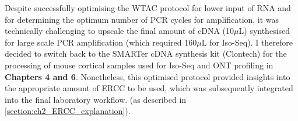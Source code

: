 Despite successfully optimising the WTAC protocol for lower input of RNA and for determining the optimum number of PCR cycles for amplification, it was technically challenging to upscale the final amount of cDNA (10$\mu$L) synthesised for large scale PCR amplification (which required 160$\mu$L for Iso-Seq). I therefore decided to switch back to the SMARTer cDNA synthesis kit (Clontech) for the processing of mouse cortical samples used for Iso-Seq and ONT profiling  in \textbf{Chapters 4 and 6}. Nonetheless, this optimised protocol provided insights into the appropriate amount of ERCC to be used, which was subsequently integrated into the final laboratory workflow. (as described in \cref{section:ch2_ERCC_explanation}).  
\resumetocwriting

